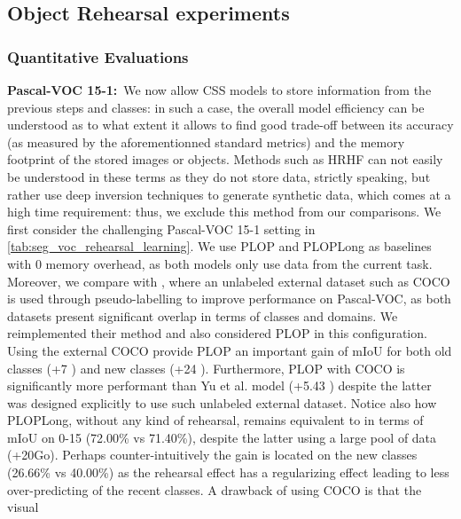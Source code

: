 \subsection{Object Rehearsal experiments}

\subsubsection{Quantitative Evaluations}



\noindent\textbf{Pascal-VOC 15-1:\,} We now allow \ac{CSS} models to store information from the previous
steps and classes: in such a case, the overall model efficiency can be understood as to what extent
it allows to find good trade-off between its accuracy (as measured by the aforementionned standard
metrics) and the memory footprint of the stored images or objects. Methods such as HRHF
\cite{huang2021halfrealhalffake} can not easily be understood in these terms as they do not store
data, strictly speaking, but rather use deep inversion \cite{yin20deepinversion} techniques to
generate synthetic data, which comes at a high time requirement: thus, we exclude this method from
our comparisons. We first consider the challenging Pascal-VOC 15-1 setting in
\autoref{tab:seg_voc_rehearsal_learning}. We use PLOP and PLOPLong as baselines with 0 memory
overhead, as both models only use data from the current task. Moreover, we compare with
\cite{yu2020continualsegmentationselftraining}, where an unlabeled external dataset such as COCO
\cite{lin2014mscocodataset} is used through pseudo-labelling to improve performance on Pascal-VOC,
as both datasets present significant overlap in terms of classes and domains. We reimplemented their
method and also considered PLOP in this configuration. Using the external COCO provide PLOP an
important gain of \ac{mIoU} for both old classes (+7 \pp) and new classes (+24
\pp). Furthermore, PLOP with COCO is significantly more performant than Yu et al. model
(+5.43 \pp) despite the latter was designed explicitly to use such unlabeled external
dataset. Notice also how PLOPLong, without any kind of rehearsal, remains equivalent to
\cite{yu2020continualsegmentationselftraining} in terms of \ac{mIoU} on 0-15 (72.00\% vs 71.40\%),
despite the latter using a large pool of data (+20Go). Perhaps counter-intuitively the gain is
located on the new classes (26.66\% vs 40.00\%) as the rehearsal effect has a regularizing effect
leading to less over-predicting of the recent classes. A drawback of using COCO is that the visual
